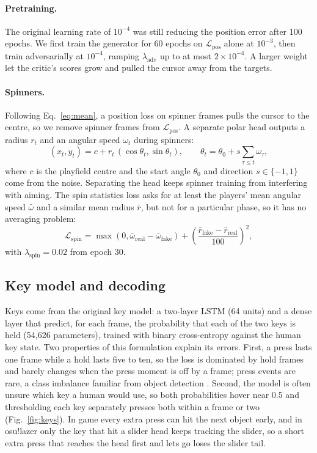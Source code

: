 \documentclass[11pt,a4paper]{article}
\begin{document}
\paragraph{Pretraining.} The original learning rate of $10^{-4}$ was still reducing the position error after
100 epochs. We first train the generator for 60 epochs on $\mathcal{L}_{\mathrm{pos}}$ alone at $10^{-3}$,
then train adversarially at $10^{-4}$, ramping $\lambda_{\mathrm{adv}}$ up to at most $2\times10^{-4}$. A
larger weight let the critic's scores grow and pulled the cursor away from the targets.

\paragraph{Spinners.} Following Eq.~\eqref{eq:mean}, a position loss on spinner frames pulls the cursor to the
centre, so we remove spinner frames from $\mathcal{L}_{\mathrm{pos}}$. A separate polar head outputs a radius
$r_t$ and an angular speed $\omega_t$ during spinners:
\begin{equation}
  (x_t,y_t)=c+r_t\,(\cos\theta_t,\sin\theta_t),\qquad \theta_t=\theta_0+s\sum_{\tau\le t}\omega_\tau,
\end{equation}
where $c$ is the playfield centre and the start angle $\theta_0$ and direction $s\in\{-1,1\}$ come from the
noise. Separating the head keeps spinner training from interfering with aiming. The spin statistics loss asks
for at least the players' mean angular speed $\bar\omega$ and a similar mean radius $\bar r$, but not for a
particular phase, so it has no averaging problem:
\begin{equation}
  \mathcal{L}_{\mathrm{spin}}=\max(0,\bar\omega_{\mathrm{real}}-\bar\omega_{\mathrm{fake}})
  +\left(\frac{\bar r_{\mathrm{fake}}-\bar r_{\mathrm{real}}}{100}\right)^2,
\end{equation}
with $\lambda_{\mathrm{spin}}=0.02$ from epoch 30.

\subsection{Key model and decoding}
Keys come from the original key model: a two-layer LSTM (64 units) and a dense layer that predict, for each
frame, the probability that each of the two keys is held (54{,}626 parameters), trained with binary
cross-entropy against the human key state. Two properties of this formulation explain its errors. First, a
press lasts one frame while a hold lasts five to ten, so the loss is dominated by hold frames and barely
changes when the press moment is off by a frame; press events are rare, a class imbalance familiar from
object detection \citep{lin2017}. Second, the model is often unsure which key a human would use, so both
probabilities hover near 0.5 and thresholding each key separately presses both within a frame or two
(Fig.~\ref{fig:keys}). In game every extra press can hit the next object early, and in osu!lazer only the key
that hit a slider head keeps tracking the slider, so a short extra press that reaches the head first and lets
go loses the slider tail.
\end{document}
